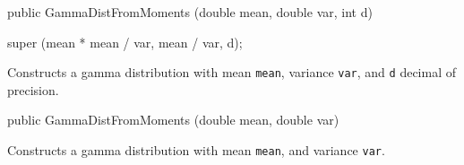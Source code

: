 \begin{code}

   public GammaDistFromMoments (double mean, double var, int d)\begin{hide} {
      super (mean * mean / var, mean / var, d);
   }\end{hide}
\end{code}
\begin{tabb} Constructs a gamma distribution with mean \texttt{mean},
 variance \texttt{var}, and \texttt{d} decimal of precision.
\end{tabb}
\begin{htmlonly}
\end{htmlonly}
\begin{code}

   public GammaDistFromMoments (double mean, double var)\begin{hide} {
      super (mean * mean / var, mean / var);
   }
}\end{hide}
\end{code}
\begin{tabb}   Constructs a gamma distribution with
 mean \texttt{mean}, and variance \texttt{var}.
\end{tabb}
\begin{htmlonly}
\end{htmlonly}

